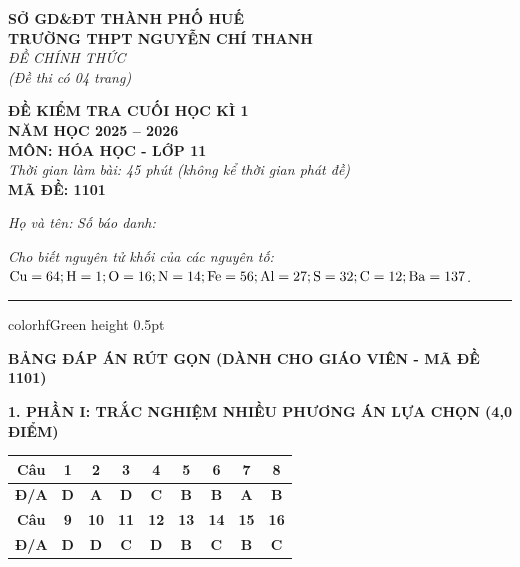 \documentclass[11pt,a4paper]{article}
\begin{document}
\begin{minipage}[t]{0.48\textwidth}
\textbf{SỞ GD\&ĐT THÀNH PHỐ HUẾ}\\
\textbf{TRƯỜNG THPT NGUYỄN CHÍ THANH}\\
\textit{ĐỀ CHÍNH THỨC}\\
\textit{(Đề thi có 04 trang)}
\end{minipage}
\hfill
\begin{minipage}[t]{0.48\textwidth}
\raggedleft
\textbf{\color{hfRed}ĐỀ KIỂM TRA CUỐI HỌC KÌ 1}\\
\textbf{NĂM HỌC 2025 -- 2026}\\
\textbf{MÔN: HÓA HỌC - LỚP 11}\\
\textit{Thời gian làm bài: 45 phút (không kể thời gian phát đề)}\\
\textbf{MÃ ĐỀ: 1101}
\end{minipage}

\vspace{4pt}
\noindent
\textit{Họ và tên:} \dotfill \textit{Số báo danh:} \dotfill

\vspace{3pt}
\noindent
\textit{\footnotesize Cho biết nguyên tử khối của các nguyên tố: $\ce{Cu} = 64; \ce{H} = 1; \ce{O} = 16; \ce{N} = 14; \ce{Fe} = 56; \ce{Al} = 27; \ce{S} = 32; \ce{C} = 12; \ce{Ba} = 137$.}

\vspace{3pt}
\hrule color{hfGreen} height 0.5pt

\vspace{6pt}
\begin{center}
{\large\bfseries\color{hfRed} BẢNG ĐÁP ÁN RÚT GỌN (DÀNH CHO GIÁO VIÊN - MÃ ĐỀ 1101)}
\end{center}

\vspace{4pt}
{\bfseries\color{mainGreen} 1. PHẦN I: TRẮC NGHIỆM NHIỀU PHƯƠNG ÁN LỰA CHỌN (4,0 ĐIỂM)}

\vspace{2pt}
\begin{center}
\renewcommand{\arraystretch}{1.2}
\begin{tabular}{|c|c|c|c|c|c|c|c|c|}
\hline
\rowcolor{tableGreen}
\textbf{Câu} & \textbf{1} & \textbf{2} & \textbf{3} & \textbf{4} & \textbf{5} & \textbf{6} & \textbf{7} & \textbf{8} \\ \hline
\textbf{Đ/A} & \textbf{\color{hfRed}D} & \textbf{\color{hfRed}A} & \textbf{\color{hfRed}D} & \textbf{\color{hfRed}C} & \textbf{\color{hfRed}B} & \textbf{\color{hfRed}B} & \textbf{\color{hfRed}A} & \textbf{\color{hfRed}B} \\ \hline
\rowcolor{tableGreen}
\textbf{Câu} & \textbf{9} & \textbf{10} & \textbf{11} & \textbf{12} & \textbf{13} & \textbf{14} & \textbf{15} & \textbf{16} \\ \hline
\textbf{Đ/A} & \textbf{\color{hfRed}D} & \textbf{\color{hfRed}D} & \textbf{\color{hfRed}C} & \textbf{\color{hfRed}D} & \textbf{\color{hfRed}B} & \textbf{\color{hfRed}C} & \textbf{\color{hfRed}B} & \textbf{\color{hfRed}C} \\ \hline
\end{tabular}
\end{center}
\end{document}
